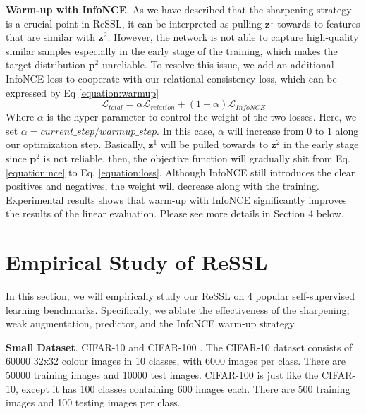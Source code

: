 \documentclass{article}
\newcommand{\<}{\left\langle}
\renewcommand{\>}{\right\rangle}
\begin{document}
\textbf{Warm-up with InfoNCE}. As we have described that the sharpening strategy is a crucial point in ReSSL, it can be interpreted as pulling $\mathbf{z}^{1}$ towards to features that are similar with $\mathbf{z}^{2}$. However, the network is not able to capture high-quality similar samples especially in the early stage of the training, which makes the target distribution $\mathbf{p}^{2}$ unreliable. To resolve this issue,
we add an additional InfoNCE loss to cooperate with our relational consistency loss, which can be expressed by Eq \eqref{equation:warmup}
\begin{equation}
    \label{equation:warmup}
    \mathcal{L}_{total} =  \alpha \mathcal{L}_{relation} + (1 - \alpha)  \mathcal{L}_{InfoNCE}
\end{equation}
Where $\alpha$ is the hyper-parameter to control the weight of the two losses. Here, we set $\alpha = current\_step / warmup\_step$. In this case, $\alpha$ will increase from $0$ to $1$ along our optimization step. Basically, $\mathbf{z}^{1}$ will be pulled towards to $\mathbf{z}^{2}$ in the early stage since $\mathbf{p}^{2}$ is not reliable, then, the objective function will gradually shit from Eq. \eqref{equation:nce}  to Eq. \eqref{equation:loss}. Although InfoNCE still introduces the clear positives and negatives, the weight will decrease along with the training. Experimental results shows that warm-up with InfoNCE significantly improves the results of the linear evaluation. Please see more details in Section 4 below.


        
        
        
        
        
        
        
        
        






 \section{Empirical Study of ReSSL}
In this section, we will empirically study our ReSSL on 4 popular self-supervised learning benchmarks. Specifically, we ablate the effectiveness of the sharpening, weak augmentation, predictor, and the InfoNCE warm-up strategy.

\textbf{Small Dataset}.
CIFAR-10 and CIFAR-100 \cite{cifar}. The CIFAR-10 dataset consists of 60000 32x32 colour images in 10 classes, with 6000 images per class. There are 50000 training images and 10000 test images. CIFAR-100 is just like the CIFAR-10, except it has 100 classes containing 600 images each. There are 500 training images and 100 testing images per class.
\end{document}
